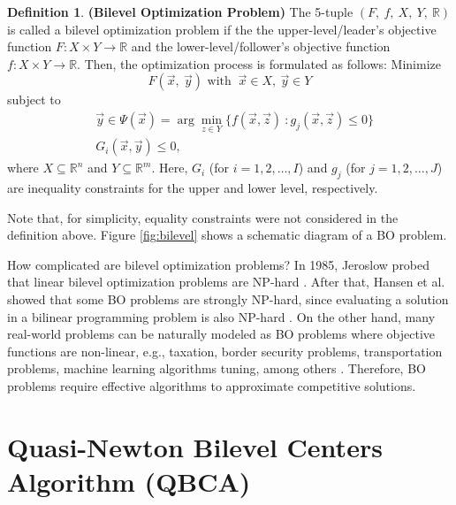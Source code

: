 \documentclass[conference]{IEEEtran}
\theoremstyle{definition}
\newtheorem{definition}{Definition}[section]
\begin{document}
\begin{definition}\textbf{(Bilevel Optimization Problem)}
    The 5-tuple $(F, \ f, \ X, \ Y, \ \mathbb{R} )$ is called a bilevel optimization
    problem if the the upper-level/leader's objective function
    $F: X \times Y \to \mathbb{R}$ and the lower-level/follower's objective
    function $f: X \times Y \to \mathbb{R}$. Then, the optimization process is
    formulated as follows:
    \noindent
    Minimize
    \begin{equation}
        F(\vec{x},\ \vec{y}) \text{ with } \ \vec{x} \in X , \ \vec{y} \in Y 
        \label{eqn:minF1}
    \end{equation}
    subject to
    \begin{align}
        \label{eqn:y-arg}
        &\vec{y} \in \Psi(\vec{x}) = \arg \min_{z\in Y} \{ f(\vec{x}, \vec{z}) \ : g_j(\vec{x}, \vec{z})  \leq 0 \} \\
        &  G_{i}(\vec{x}, \vec{y}) \leq 0,
    \end{align}
    where $X \subseteq \mathbb{R}^n $
    and $Y \subseteq \mathbb{R}^m$.
    Here, $G_i$ (for $i = 1,2,\ldots,I$) and $g_j$ (for $j = 1,2,\ldots,J$) are
    inequality constraints for the upper and lower level, respectively.
\end{definition}
% 
Note that, for simplicity, equality constraints were not considered in the definition
above. Figure \ref{fig:bilevel} shows a schematic diagram of a BO problem.
% 

How complicated are bilevel optimization problems?  In 1985, Jeroslow probed that
linear bilevel optimization problems are NP-hard \cite{jeroslow1985polynomial}.
After that, Hansen et al. showed that some BO problems are strongly NP-hard, since
evaluating a solution in a bilinear programming problem is also NP-hard
\cite{hansen1992new,vicente1994descent}. On the other hand, many real-world problems can
be naturally modeled as BO problems \cite{sinha2018review} where objective functions
are non-linear, e.g., taxation, border security problems, transportation problems,
machine learning algorithms tuning, among others \cite{bard2013practical,sinha2018review,arroyo2010bilevel}.
Therefore, BO problems require effective algorithms to approximate competitive
solutions.



\section{Quasi-Newton Bilevel Centers Algorithm (QBCA)} %
\label{sec:qca}
\end{document}
